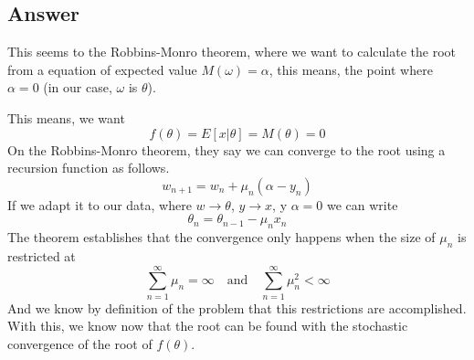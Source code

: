 \documentclass[conference, onecolumn]{IEEEtran}
\begin{document}
	\subsection*{Answer}
	This seems to the Robbins-Monro theorem, where we want to calculate the root from a equation of expected value $M (\omega) = \alpha$, this means, the point where $\alpha = 0$ (in our case, $\omega$ is $\theta$).
	
	This means, we want 
	\begin{equation}
		f(\theta) = E[x|\theta] = M(\theta) = 0
	\end{equation}
	On the Robbins-Monro theorem, they say we can converge to the root using a recursion function as follows.
	\begin{equation}
		w_{n+1} = w_n + \mu_n(\alpha - y_n)
	\end{equation}
	If we adapt it to our data, where $w \rightarrow \theta$, $y \rightarrow x$, y $\alpha = 0$ we can write 
	\begin{equation}
		\theta_n = \theta_{n-1} - \mu_nx_n
	\end{equation}
	The theorem establishes that the convergence only happens when the size of $\mu_n$ is restricted at
	\begin{equation}
		\sum_{n=1}^{\infty} \mu_n = \infty \quad \text{and} \quad \sum_{n=1}^{\infty} \mu_n^2 < \infty
	\end{equation}
	And we know by definition of the problem that this restrictions are accomplished. With this, we know now that the root can be found with the stochastic convergence of the root of $f(\theta)$.
	
\end{document}
